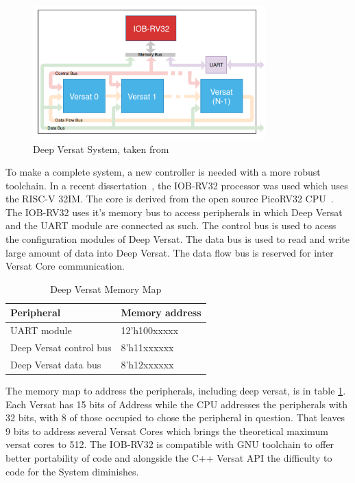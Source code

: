 \begin{figure}[!htbp]
    \centering
    \includegraphics[width=0.8\textwidth]{Figures/deep-versat-top.png}
    \caption{Deep Versat System, taken from~\cite{valter:deepversat}}
    \label{figure:deepversattop}
\end{figure} 

\quad To make a complete system, a new controller is needed with a more robust toolchain.
In a recent dissertation~\cite{valter:deepversat}, the IOB-RV32 processor was used which uses the RISC-V 32IM. The core is derived from
the open source PicoRV32 CPU~\cite{picorv}.
The IOB-RV32 uses it's memory bus to access peripherals in which Deep Versat and the UART module are connected as such.
The control bus is used to acess the configuration modules of Deep Versat. The data bus is used to read and write
large amount of data into Deep Versat. The data flow bus is reserved for inter Versat Core communication.

\begin{table}[!htbp]
    \centering
    \begin{tabular}{|ll|}
        \hline
        \textbf{Peripheral}     & \textbf{Memory address} \\ \hline
        UART module             & 12’h100xxxxx            \\ \hline
        Deep Versat control bus & 8’h11xxxxxx             \\ \hline
        Deep Versat data bus    & 8’h12xxxxxx             \\ \hline
        \end{tabular}
    \caption{Deep Versat Memory Map}
    \label{table:deepversat}
    \end{table}


The memory map to address the peripherals,
 including deep versat, is in table \ref{table:deepversat}.
 Each Versat has 15 bits of Address while the CPU addresses
 the peripherals with 32 bits, with 8 of those occupied to chose
 the peripheral in question. That leaves 9 bits to address several Versat Cores
 which brings the theoretical maximum versat cores to 512. The IOB-RV32 is compatible with
 GNU toolchain to offer better portability of code and alongside the C++ Versat API the difficulty
 to code for the System diminishes.
